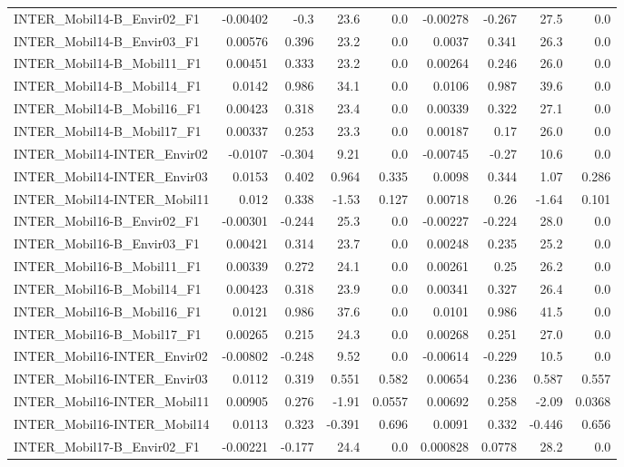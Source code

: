 \begin{tabular}{lrrrrrrrr}
INTER_Mobil14-B_Envir02_F1 & -0.00402 & -0.3 & 23.6 & 0.0 & -0.00278 & -0.267 & 27.5 & 0.0 \\
INTER_Mobil14-B_Envir03_F1 & 0.00576 & 0.396 & 23.2 & 0.0 & 0.0037 & 0.341 & 26.3 & 0.0 \\
INTER_Mobil14-B_Mobil11_F1 & 0.00451 & 0.333 & 23.2 & 0.0 & 0.00264 & 0.246 & 26.0 & 0.0 \\
INTER_Mobil14-B_Mobil14_F1 & 0.0142 & 0.986 & 34.1 & 0.0 & 0.0106 & 0.987 & 39.6 & 0.0 \\
INTER_Mobil14-B_Mobil16_F1 & 0.00423 & 0.318 & 23.4 & 0.0 & 0.00339 & 0.322 & 27.1 & 0.0 \\
INTER_Mobil14-B_Mobil17_F1 & 0.00337 & 0.253 & 23.3 & 0.0 & 0.00187 & 0.17 & 26.0 & 0.0 \\
INTER_Mobil14-INTER_Envir02 & -0.0107 & -0.304 & 9.21 & 0.0 & -0.00745 & -0.27 & 10.6 & 0.0 \\
INTER_Mobil14-INTER_Envir03 & 0.0153 & 0.402 & 0.964 & 0.335 & 0.0098 & 0.344 & 1.07 & 0.286 \\
INTER_Mobil14-INTER_Mobil11 & 0.012 & 0.338 & -1.53 & 0.127 & 0.00718 & 0.26 & -1.64 & 0.101 \\
INTER_Mobil16-B_Envir02_F1 & -0.00301 & -0.244 & 25.3 & 0.0 & -0.00227 & -0.224 & 28.0 & 0.0 \\
INTER_Mobil16-B_Envir03_F1 & 0.00421 & 0.314 & 23.7 & 0.0 & 0.00248 & 0.235 & 25.2 & 0.0 \\
INTER_Mobil16-B_Mobil11_F1 & 0.00339 & 0.272 & 24.1 & 0.0 & 0.00261 & 0.25 & 26.2 & 0.0 \\
INTER_Mobil16-B_Mobil14_F1 & 0.00423 & 0.318 & 23.9 & 0.0 & 0.00341 & 0.327 & 26.4 & 0.0 \\
INTER_Mobil16-B_Mobil16_F1 & 0.0121 & 0.986 & 37.6 & 0.0 & 0.0101 & 0.986 & 41.5 & 0.0 \\
INTER_Mobil16-B_Mobil17_F1 & 0.00265 & 0.215 & 24.3 & 0.0 & 0.00268 & 0.251 & 27.0 & 0.0 \\
INTER_Mobil16-INTER_Envir02 & -0.00802 & -0.248 & 9.52 & 0.0 & -0.00614 & -0.229 & 10.5 & 0.0 \\
INTER_Mobil16-INTER_Envir03 & 0.0112 & 0.319 & 0.551 & 0.582 & 0.00654 & 0.236 & 0.587 & 0.557 \\
INTER_Mobil16-INTER_Mobil11 & 0.00905 & 0.276 & -1.91 & 0.0557 & 0.00692 & 0.258 & -2.09 & 0.0368 \\
INTER_Mobil16-INTER_Mobil14 & 0.0113 & 0.323 & -0.391 & 0.696 & 0.0091 & 0.332 & -0.446 & 0.656 \\
INTER_Mobil17-B_Envir02_F1 & -0.00221 & -0.177 & 24.4 & 0.0 & 0.000828 & 0.0778 & 28.2 & 0.0 \\

\end{tabular}
